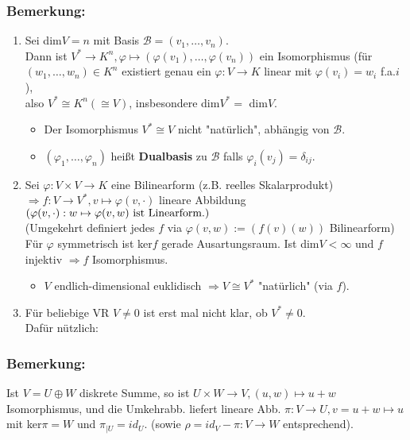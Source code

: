 \documentclass[a4paper, 12pt]{extarticle}
\newcommand{\tn}[1]{\textnormal {#1}}
\newcommand{\transp}[2][50]{\color{black!#1}#2}
\begin{document}
\subsubsection*{Bemerkung:}
\begin{enumerate}[label=\alph*)]
	\item Sei dim$V = n$ mit Basis $\mathcal{B} = (v_1, \dots, v_n)$.\\
	Dann ist  $V^*\longrightarrow K^n, \varphi \mapsto (\varphi(v_1), \dots, \varphi(v_n))$ ein Isomorphismus \transp{(für $(w_1, \dots, w_n) \in K^n$ existiert genau ein $\varphi:V\longrightarrow K$ linear mit $\varphi(v_i) = w_i$ f.a.$i$)},\\ \transp[100]{also $V^* \cong K^n(\cong V)$, insbesondere dim$V^* = $ dim$V$.}
	\begin{itemize}
		\item Der Isomorphismus $V^*\cong V$ nicht "natürlich", abhängig von $\mathcal{B}$.
		\item $(\varphi_1, \dots, \varphi_n)$ heißt \textbf{Dualbasis} zu $\mathcal{B}$ falls $\varphi_i(v_j) = \delta_{ij}$.
	\end{itemize}
	\item Sei $\varphi:V\times V\longrightarrow K$ eine Bilinearform (z.B. reelles Skalarprodukt)\\
	$\Rightarrow f:V\longrightarrow V^*, v \mapsto \varphi(v, \cdot)$ lineare Abbildung\\
	$(\varphi(v, \cdot): w\mapsto \varphi(v, w) \tn{ ist Linearform.})$\\
	(Umgekehrt definiert jedes $f$ via $\varphi(v, w) := (f(v)(w))$ Bilinearform)\\
	Für $\varphi$ symmetrisch ist ker$f$ gerade Ausartungsraum. Ist dim$V < \infty$ und $f$ injektiv $\Rightarrow f$ Isomorphismus.
	\begin{itemize}
		\item $V$ endlich-dimensional euklidisch $\Rightarrow V \cong V^*$ "natürlich" (via $f$).
	\end{itemize} 
	\item Für beliebige VR $V \neq 0$ ist erst mal nicht klar, ob $V^* \neq 0$.\\
	Dafür nützlich:
\end{enumerate}
\subsubsection*{Bemerkung:}
Ist $V = U \oplus W$ diskrete Summe, so ist $U\times W \longrightarrow V, (u, w) \mapsto u+w$ Isomorphismus, und die Umkehrabb. liefert lineare Abb. $\pi:V\longrightarrow U, v = u+w \mapsto u$ mit ker$\pi = W$ und $\pi_{|U} = id_U$. (sowie $\rho = id_V - \pi: V\longrightarrow W$ entsprechend).
\end{document}

